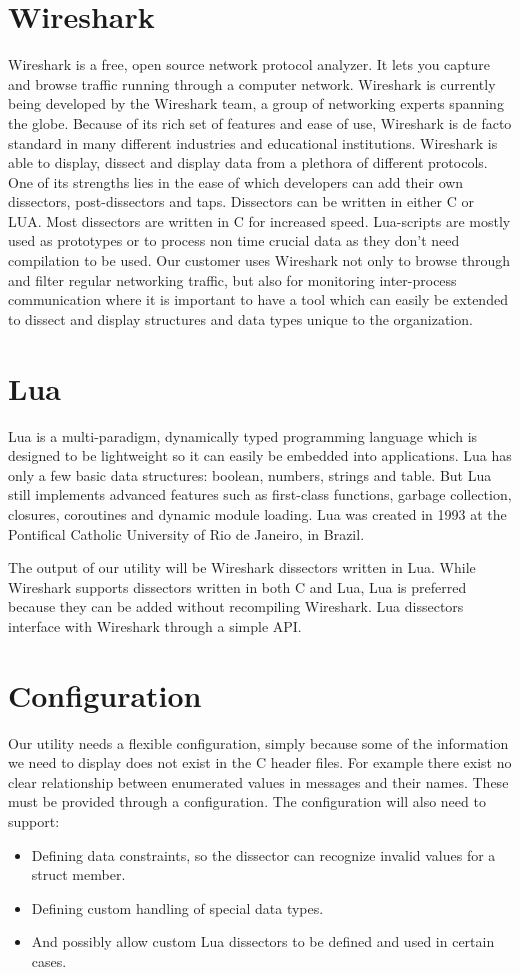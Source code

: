 \begin{description}
\section{Wireshark}
Wireshark is a free, open source network protocol analyzer. It lets you capture
and browse traffic running through a computer network. Wireshark is currently
being developed by the Wireshark team, a group of networking experts spanning
the globe. Because of its rich set of features and ease of use, Wireshark is de
facto standard in many different industries and educational institutions.
Wireshark is able to display, dissect and display data from a plethora of
different protocols. One of its strengths lies in the ease of which developers
can add their own dissectors, post-dissectors and taps. Dissectors can be
written in either C or LUA. Most dissectors are written in C for increased
speed. Lua-scripts are mostly used as prototypes or to process non time crucial
data as they don’t need compilation to be used. Our customer uses Wireshark not
only to browse through and filter regular networking traffic, but also for
monitoring inter-process communication where it is important to have a tool
which can easily be extended to dissect and display structures and data types
unique to the organization.

\section{Lua}
Lua is a multi-paradigm, dynamically typed programming language which is
designed to be lightweight so it can easily be embedded into applications.
Lua has only a few basic data structures: boolean, numbers, strings and table.
But Lua still implements advanced features such as first-class functions,
garbage collection, closures, coroutines and dynamic module loading. Lua was
created in 1993 at the Pontifical Catholic University of Rio de Janeiro, in
Brazil.

The output of our utility will be Wireshark dissectors written in Lua. While
Wireshark supports dissectors written in both C and Lua, Lua is preferred
because they can be added without recompiling Wireshark. Lua dissectors
interface with Wireshark through a simple API.

\section{Configuration}
Our utility needs a flexible configuration, simply because some of the
information we need to display does not exist in the C header files. For
example there exist no clear relationship between enumerated values in messages
and their names. These must be provided through a configuration. The
configuration will also need to support:
\begin{itemize}
	\item Defining data constraints, so the dissector can recognize invalid
		values for a struct member.
	\item Defining custom handling of special data types.
	\item  And possibly allow custom Lua dissectors to be defined and used in
		certain cases.
\end{itemize}


\end{description}

